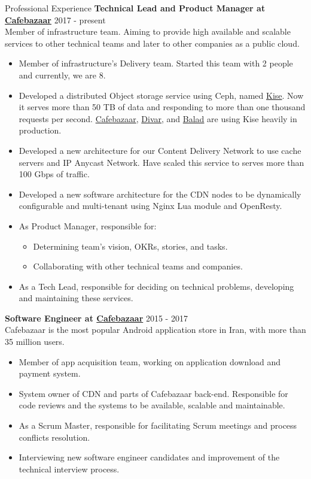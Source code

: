\documentclass{resume} %
\begin{document}
\begin{rSection}{Professional Experience}
	{\bf Technical Lead and Product Manager at \href{https://cafebazaar.ir/}{Cafebazaar}} \hfill 2017 - present
	\\ Member of infrastructure team. Aiming to provide high available and scalable services to other technical teams and later to other companies as a public cloud.
	\begin{itemize}
		\item Member of infrastructure's Delivery team. Started this team with 2 people and currently, we are 8.
		\item Developed a distributed Object storage service using Ceph, named \href{https://kise.roo.cloud/}{Kise}. Now it serves more than 50 TB of data and responding to more than one thousand requests per second. \href{https://cafebazaar.ir/}{Cafebazaar}, \href{https://divar.ir/}{Divar}, and \href{http://balad.ir/}{Balad} are using Kise heavily in production.
		\item Developed a new architecture for our Content Delivery Network to use cache servers and IP Anycast Network. Have scaled this service to serves more than 100 Gbps of traffic.
		\item Developed a new software architecture for the CDN nodes to be dynamically configurable and multi-tenant using Nginx Lua module and OpenResty.
		\item As Product Manager, responsible for:
		\begin{itemize}
			\item Determining team's vision, OKRs, stories, and tasks.
			\item Collaborating with other technical teams and companies.
		\end{itemize}
		\item As a Tech Lead, responsible for deciding on technical problems, developing and maintaining these services.
	\end{itemize}

	{\bf Software Engineer at \href{https://cafebazaar.ir/}{Cafebazaar}} \hfill 2015 - 2017
	\\ Cafebazaar is the most popular Android application store in Iran, with more than 35 million users.
	\begin{itemize}
		\item Member of app acquisition team, working on application download and payment system.
		\item System owner of CDN and parts of Cafebazaar back-end. Responsible for code reviews and the systems to be available, scalable and maintainable.
		\item As a Scrum Master, responsible for facilitating Scrum meetings and process conflicts resolution.
		\item Interviewing new software engineer candidates and improvement of the technical interview process.
	\end{itemize}


\end{rSection}
\end{document}
